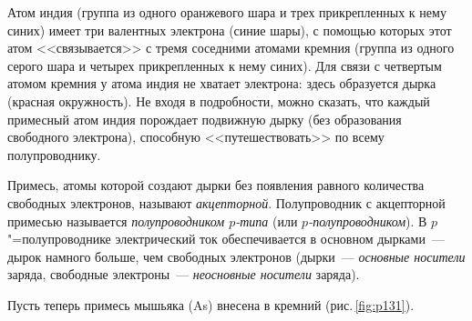 \documentclass[main.tex]{subfiles}
\begin{document}
Атом индия (группа из одного оранжевого шара и трех прикрепленных к нему синих) имеет три валентных электрона (синие шары), с помощью которых этот атом <<связывается>> с тремя соседними атомами кремния (группа из одного серого шара и четырех прикрепленных к нему синих). Для связи с четвертым атомом кремния у атома индия не хватает электрона: здесь образуется дырка (красная окружность). Не входя в подробности, можно сказать, что каждый примесный атом индия порождает подвижную дырку (без образования свободного электрона),
способную <<путешествовать>> по всему полупроводнику.

Примесь, атомы которой создают дырки без появления равного количества свободных электронов, называют \emph{акцепторной}. Полупроводник с акцепторной примесью называется \emph{полупроводником $p$-типа} (или \emph{$p$-полупроводником}). В $p$"=полупроводнике электрический ток обеспечивается в основном дырками~--- дырок намного больше, чем свободных электронов (дырки~--- \emph{основные носители} заряда, свободные электроны~--- \emph{неосновные носители} заряда). 

Пусть теперь примесь мышьяка (As) внесена в кремний (рис.\,\ref{fig:p131}).
\end{document}

